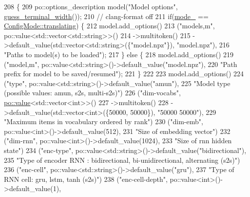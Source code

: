\begin{DoxyCode}
208                                                               \{
209   po::options\_description model(\textcolor{stringliteral}{"Model options"}, \hyperlink{namespacemarian_aa656da9ccb3e53462fef9b9745616b57}{guess\_terminal\_width}());
210   \textcolor{comment}{// clang-format off}
211   \textcolor{keywordflow}{if}(\hyperlink{classmarian_1_1ConfigParser_ae3bb2ffc2601222cc53734a60ab1f980}{mode\_} == \hyperlink{namespacemarian_aaddd4b008ff5352b1fe7e16574f7e1f9a5143d2bebfe7a6b9c7050a8f6bf53e2b}{ConfigMode::translating}) \{
212     model.add\_options()
213     (\textcolor{stringliteral}{"models,m"}, po::value<std::vector<std::string>>()
214       ->multitoken()
215       ->default\_value(std::vector<std::string>(\{\textcolor{stringliteral}{"model.npz"}\}), \textcolor{stringliteral}{"model.npz"}),
216      \textcolor{stringliteral}{"Paths to model(s) to be loaded"});
217   \} \textcolor{keywordflow}{else} \{
218     model.add\_options()
219       (\textcolor{stringliteral}{"model,m"}, po::value<std::string>()->default\_value(\textcolor{stringliteral}{"model.npz"}),
220       \textcolor{stringliteral}{"Path prefix for model to be saved/resumed"});
221   \}
222 
223   model.add\_options()
224     (\textcolor{stringliteral}{"type"}, po::value<std::string>()->default\_value(\textcolor{stringliteral}{"amun"}),
225       \textcolor{stringliteral}{"Model type (possible values: amun, s2s, multi-s2s)"})
226     (\textcolor{stringliteral}{"dim-vocabs"}, \hyperlink{namespacemarian_1_1keywords_ac70de1b4c3cf6b7080cf5086f2963fd8}{po::value}<std::vector<int>>()
227       ->multitoken()
228       ->default\_value(std::vector<int>(\{50000, 50000\}), \textcolor{stringliteral}{"50000 50000"}),
229      \textcolor{stringliteral}{"Maximum items in vocabulary ordered by rank"})
230     (\textcolor{stringliteral}{"dim-emb"}, po::value<int>()->default\_value(512),
231      \textcolor{stringliteral}{"Size of embedding vector"})
232     (\textcolor{stringliteral}{"dim-rnn"}, po::value<int>()->default\_value(1024),
233      \textcolor{stringliteral}{"Size of rnn hidden state"})
234     (\textcolor{stringliteral}{"enc-type"}, po::value<std::string>()->default\_value(\textcolor{stringliteral}{"bidirectional"}),
235      \textcolor{stringliteral}{"Type of encoder RNN : bidirectional, bi-unidirectional, alternating (s2s)"})
236     (\textcolor{stringliteral}{"enc-cell"}, po::value<std::string>()->default\_value(\textcolor{stringliteral}{"gru"}),
237      \textcolor{stringliteral}{"Type of RNN cell: gru, lstm, tanh (s2s)"})
238     (\textcolor{stringliteral}{"enc-cell-depth"}, po::value<int>()->default\_value(1),

\end{DoxyCode}
